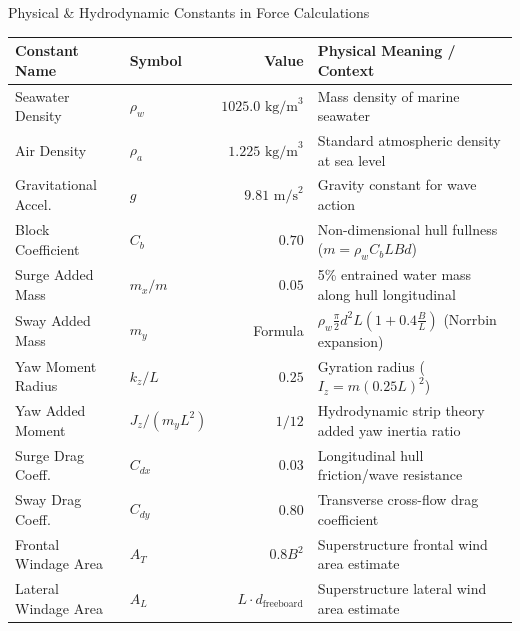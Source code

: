\documentclass[t]{beamer}
\begin{document}
\begin{frame}{Physical \& Hydrodynamic Constants in Force Calculations}
    \begin{table}
    \centering
    \scriptsize
    \begin{tabular}{llrl}
    \toprule
    \textbf{Constant Name} & \textbf{Symbol} & \textbf{Value} & \textbf{Physical Meaning / Context} \\
    \midrule
    Seawater Density & $\rho_w$ & $1025.0\text{ kg/m}^3$ & Mass density of marine seawater \\
    Air Density & $\rho_a$ & $1.225\text{ kg/m}^3$ & Standard atmospheric density at sea level \\
    Gravitational Accel. & $g$ & $9.81\text{ m/s}^2$ & Gravity constant for wave action \\
    Block Coefficient & $C_b$ & $0.70$ & Non-dimensional hull fullness ($m = \rho_w C_b L B d$) \\
    Surge Added Mass & $m_x / m$ & $0.05$ & 5\% entrained water mass along hull longitudinal \\
    Sway Added Mass & $m_y$ & Formula & $\rho_w \frac{\pi}{2} d^2 L \left(1 + 0.4 \frac{B}{L}\right)$ (Norrbin expansion) \\
    Yaw Moment Radius & $k_z / L$ & $0.25$ & Gyration radius ($I_z = m (0.25 L)^2$) \\
    Yaw Added Moment & $J_z / (m_y L^2)$ & $1/12$ & Hydrodynamic strip theory added yaw inertia ratio \\
    Surge Drag Coeff. & $C_{dx}$ & $0.03$ & Longitudinal hull friction/wave resistance \\
    Sway Drag Coeff. & $C_{dy}$ & $0.80$ & Transverse cross-flow drag coefficient \\
    Frontal Windage Area & $A_T$ & $0.8 B^2$ & Superstructure frontal wind area estimate \\
    Lateral Windage Area & $A_L$ & $L \cdot d_{\mathrm{freeboard}}$ & Superstructure lateral wind area estimate \\
    \bottomrule
    \end{tabular}
    \end{table}
\end{frame}
\end{document}
